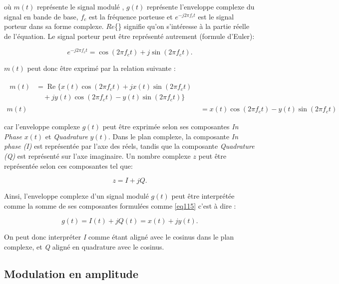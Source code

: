 où $m(t)$ représente le signal modulé , $g(t)$ représente l'enveloppe complexe du signal en bande de base, $f_c$ est la fréquence porteuse et $e^{-j2\pi f_c t}$ est le signal porteur dans sa forme complexe. $Re$\{\} signifie qu'on s'intéresse à la partie réelle de l'équation. Le signal porteur peut être représenté autrement (formule d'Euler):

\begin{equation}\label{eq111}
e^{-j2\pi f_c t} = \cos(2 \pi f_c t) + j \sin(2 \pi f_c t).
\end{equation}

$m(t)$ peut donc être exprimé par la relation suivante :

\begin{align}
    \begin{split}
    m(t) &= \operatorname{Re} \{ x(t) \cos(2 \pi f_c t) + j x(t) \sin(2 \pi f_c t) \\
         &\quad + j y(t) \cos(2 \pi f_c t) - y(t) \sin(2 \pi f_c t)\}
    \end{split} \\
    m(t) &= x(t) \cos(2 \pi f_c t) - y(t) \sin(2 \pi f_c t)
\end{align}

car l'enveloppe complexe $g(t)$ peut être exprimée selon ses composantes \textit{In Phase} $x(t)$ et \textit{Quadrature} $y(t)$. Dans le plan complexe, la composante \textit{In phase (I)} est représentée par l'axe des réels, tandis que la composante \textit{Quadrature (Q)} est représenté sur l'axe imaginaire. Un nombre complexe $z$ peut être représentée selon ces composantes tel que:

\begin{equation}\label{eq115}
z = I + jQ.
\end{equation}

Ainsi, l'enveloppe complexe d'un signal modulé $g(t)$ peut être interprétée comme la somme de ses composantes formulées comme \ref{eq115} c'est à dire :

\begin{equation}\label{eq116}
g(t) = I(t) + jQ(t) = x(t) + jy(t).
\end{equation}

On peut donc interpréter \textit{I} comme étant aligné avec le cosinus dans le plan complexe, et \textit{Q} aligné en quadrature avec le cosinus.

\subsection{Modulation en amplitude}

